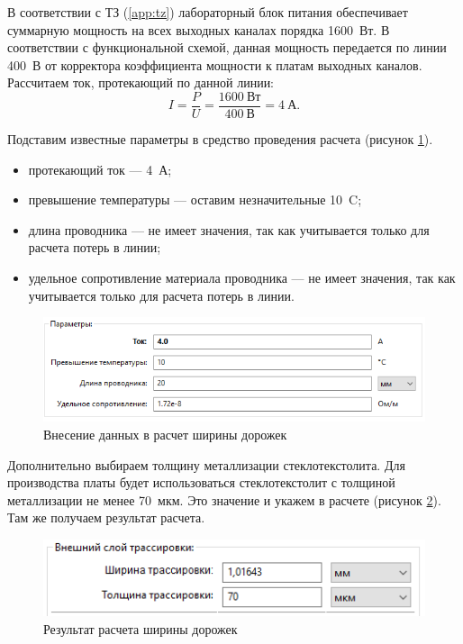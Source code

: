 \documentclass[utf8x, 14pt, oneside, a4paper]{article}
\begin{document}
		В соответствии с ТЗ (\ref{app:tz}) лабораторный блок питания обеспечивает суммарную мощность на всех выходных каналах порядка 1600~Вт. В соответствии с функциональной схемой, данная мощность передается по линии 400~В от корректора коэффициента мощности к платам выходных каналов. Рассчитаем ток, протекающий по данной линии:
		\begin{equation}
			I = \frac{P}{U} = \frac{1600~\text{Вт}}{400~\text{В}} = 4~\text{А}.
		\end{equation}
	
		Подставим известные параметры в средство проведения расчета (рисунок \ref{fig:kicad-calc-trassing-param}).
		
		\begin{itemize}
			\item протекающий ток --- 4~А;
			\item превышение температуры --- оставим незначительные 10~{\textdegree}C;
			\item длина проводника --- не имеет значения, так как учитывается только для расчета потерь в линии;
			\item удельное сопротивление материала проводника --- не имеет значения, так как учитывается только для расчета потерь в линии.
		\end{itemize}
		
		\begin{figure}[H]
			\centering
			\includegraphics[width=0.7\linewidth]{"Рисунки/KiCad-calc-trassing-param"}
			\caption{Внесение данных в расчет ширины дорожек}
			\label{fig:kicad-calc-trassing-param}
		\end{figure}
	
		Дополнительно выбираем толщину металлизации стеклотекстолита. Для производства платы будет использоваться стеклотекстолит с толщиной металлизации не менее 70~мкм. Это значение и укажем в расчете (рисунок \ref{fig:kicad-calc-trassing-result}). Там же получаем результат расчета.
		
		\begin{figure}[H]
			\centering
			\includegraphics[width=0.7\linewidth]{"Рисунки/KiCad-calc-trassing-result"}
			\caption{Результат расчета ширины дорожек}
			\label{fig:kicad-calc-trassing-result}
		\end{figure}
	
\end{document}
